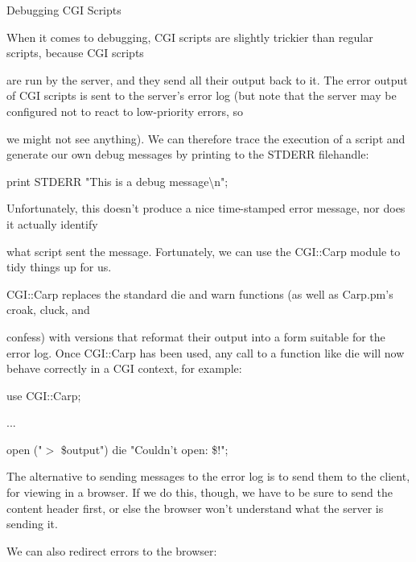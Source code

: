 \documentclass[a4paper,11pt]{book}
\begin{document}
\noindent Debugging CGI Scripts

\noindent 

\noindent When it comes to debugging, CGI scripts are slightly trickier than regular scripts, because CGI scripts

\noindent are run by the server, and they send all their output back to it. The error output of CGI scripts is sent to the server's error log (but note that the server may be configured not to react to low-priority errors, so

\noindent we might not see anything). We can therefore trace the execution of a script and generate our own debug messages by printing to the STDERR filehandle:

\noindent 

\noindent print STDERR "This is a debug message\textbackslash n";

\noindent 

\noindent Unfortunately, this doesn't produce a nice time-stamped error message, nor does it actually identify

\noindent what script sent the message. Fortunately, we can use the CGI::Carp module to tidy things up for us.

\noindent 

\noindent 

\noindent CGI::Carp replaces the standard die and warn functions (as well as Carp.pm's croak, cluck, and

\noindent confess) with versions that reformat their output into a form suitable for the error log. Once CGI::Carp has been used, any call to a function like die will now behave correctly in a CGI context, for example:

\noindent 

\noindent use CGI::Carp;

\noindent ...

\noindent open ("$>$ \$output") \textbar  die "Couldn't open: \$!";

\noindent 

\noindent The alternative to sending messages to the error log is to send them to the client, for viewing in a browser. If we do this, though, we have to be sure to send the content header first, or else the browser won't understand what the server is sending it.

\noindent 

\noindent We can also redirect errors to the browser:

\noindent 
\end{document}
